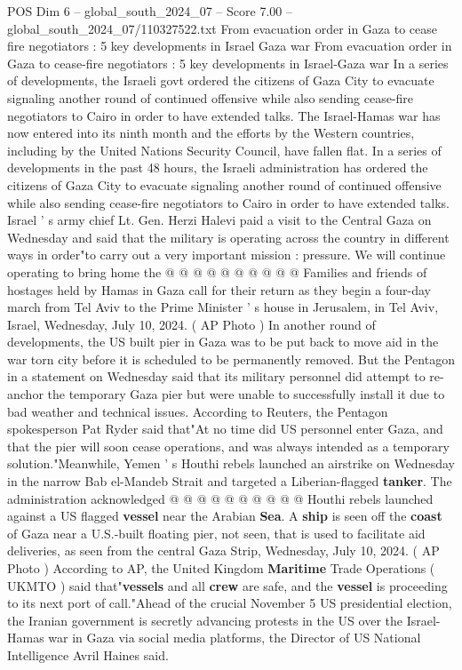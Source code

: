 \begin{textsample}{POS Dim 6 – global\_south\_2024\_07 – Score 7.00 – global\_south\_2024\_07/110327522.txt}  \label{ex:f6_pos_333}
From evacuation order in Gaza to cease fire negotiators : 5 key developments in Israel Gaza war From evacuation order in Gaza to cease-fire negotiators : 5 key developments in Israel-Gaza war In a series of developments, the Israeli govt ordered the citizens of Gaza City to evacuate signaling another round of continued offensive while also sending cease-fire negotiators to Cairo in order to have extended talks.
The Israel-Hamas war has now entered into its ninth month and the efforts by the Western countries, including by the United Nations Security Council, have fallen flat.
In a series of developments in the past 48 hours, the Israeli administration has ordered the citizens of Gaza City to evacuate signaling another round of continued offensive while also sending cease-fire negotiators to Cairo in order to have extended talks.
Israel ' s army chief Lt.
Gen.
Herzi Halevi paid a visit to the Central Gaza on Wednesday and said that the military is operating across the country in different ways in order"to carry out a very important mission : pressure.
We will continue operating to bring home the @ @ @ @ @ @ @ @ @ @ Families and friends of hostages held by Hamas in Gaza call for their return as they begin a four-day march from Tel Aviv to the Prime Minister ' s house in Jerusalem, in Tel Aviv, Israel, Wednesday, July 10, 2024. ( AP Photo ) In another round of developments, the US built pier in Gaza was to be put back to move aid in the war torn city before it is scheduled to be permanently removed.
But the Pentagon in a statement on Wednesday said that its military personnel did attempt to re-anchor the temporary Gaza pier but were unable to successfully install it due to bad weather and technical issues.
According to Reuters, the Pentagon spokesperson Pat Ryder said that"At no time did US personnel enter Gaza, and that the pier will soon cease operations, and was always intended as a temporary solution."Meanwhile, Yemen ' s Houthi rebels launched an airstrike on Wednesday in the narrow Bab el-Mandeb Strait and targeted a Liberian-flagged \textbf{tanker}.
The administration acknowledged @ @ @ @ @ @ @ @ @ @ Houthi rebels launched against a US flagged \textbf{vessel} near the Arabian \textbf{Sea}.
A \textbf{ship} is seen off the \textbf{coast} of Gaza near a U.S.-built floating pier, not seen, that is used to facilitate aid deliveries, as seen from the central Gaza Strip, Wednesday, July 10, 2024. ( AP Photo ) According to AP, the United Kingdom \textbf{Maritime} Trade Operations ( UKMTO ) said that"\textbf{vessels} and all \textbf{crew} are safe, and the \textbf{vessel} is proceeding to its next port of call."Ahead of the crucial November 5 US presidential election, the Iranian government is secretly advancing protests in the US over the Israel-Hamas war in Gaza via social media platforms, the Director of US National Intelligence Avril Haines said.

\end{textsample}

